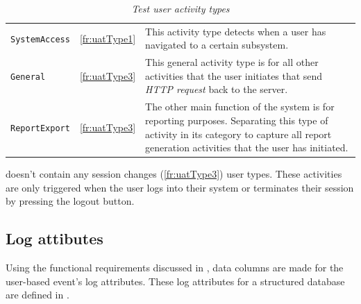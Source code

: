 \begin{table}[!htb]
	\centering
	\caption[Test user activity types]{\textit{Test user activity types}}
	\label{tbl:ch3_testActivityTypes}
	\begin{tabularx}{\textwidth}{llX}
		\toprule
		\thead{Activity} & \thead{Functional requirement} & \thead{Description} \\
		\midrule
		\rowcolor{lightgray}
		\texttt{SystemAccess} & \ref{fr:uatType1} & \RaggedRight This activity type detects when a user has navigated to a certain subsystem. \\ 
		\texttt{General} & \ref{fr:uatType3} & \RaggedRight This general activity type is for all other activities that the user initiates that send \textit{HTTP request} back to the server. \\
		\rowcolor{lightgray}
		\texttt{ReportExport} & \ref{fr:uatType3} & \RaggedRight The other main function of the system is for reporting purposes. Separating this type of activity in its category to capture all report generation activities that the user has initiated. \\ 
		\bottomrule
	\end{tabularx}
\end{table}

 doesn't contain any session changes (\ref{fr:uatType3}) user types. These activities are only triggered when the user logs into their system or terminates their session by pressing the logout button.

\subsection{Log attibutes}\label{sec:ch3_implementationLogAtrributes}
Using the functional requirements discussed in , data columns are made for the user-based event's log attributes. These log attributes for a structured database are defined in . 

